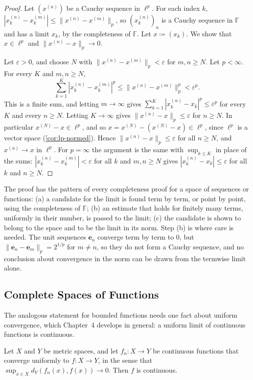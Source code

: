 \begin{proof}
Let $(x^{(n)})$ be a Cauchy sequence in $\ell^p$. For each index $k$, $|x^{(n)}_k-x^{(m)}_k|\le\|x^{(n)}-x^{(m)}\|_p$, so $(x^{(n)}_k)_n$ is a Cauchy sequence in $\mathbb F$ and has a limit $x_k$, by the completeness of $\mathbb F$. Let $x\coloneqq(x_k)$. We show that $x\in\ell^p$ and $\|x^{(n)}-x\|_p\to0$.

Let $\varepsilon>0$, and choose $N$ with $\|x^{(n)}-x^{(m)}\|_p<\varepsilon$ for $m,n\ge N$. Let $p<\infty$. For every $K$ and $m,n\ge N$,
\[
\sum_{k=1}^K|x^{(n)}_k-x^{(m)}_k|^p\le\|x^{(n)}-x^{(m)}\|_p^p<\varepsilon^p .
\]
This is a finite sum, and letting $m\to\infty$ gives $\sum_{k=1}^K|x^{(n)}_k-x_k|^p\le\varepsilon^p$ for every $K$ and every $n\ge N$. Letting $K\to\infty$ gives $\|x^{(n)}-x\|_p\le\varepsilon$ for $n\ge N$. In particular $x^{(N)}-x\in\ell^p$, and so $x=x^{(N)}-(x^{(N)}-x)\in\ell^p$, since $\ell^p$ is a vector space (\cref{cor:lp-normed}). Hence $\|x^{(n)}-x\|_p\le\varepsilon$ for all $n\ge N$, and $x^{(n)}\to x$ in $\ell^p$. For $p=\infty$ the argument is the same with $\sup_{k\le K}$ in place of the sums: $|x^{(n)}_k-x^{(m)}_k|<\varepsilon$ for all $k$ and $m,n\ge N$ gives $|x^{(n)}_k-x_k|\le\varepsilon$ for all $k$ and $n\ge N$.
\end{proof}

The proof has the pattern of every completeness proof for a space of sequences or functions: (a) a candidate for the limit is found term by term, or point by point, using the completeness of $\mathbb F$; (b) an estimate that holds for finitely many terms, uniformly in their number, is passed to the limit; (c) the candidate is shown to belong to the space and to be the limit in its norm. Step (b) is where care is needed. The unit sequences $\mathbf e_n$ converge term by term to $0$, but $\|\mathbf e_n-\mathbf e_m\|_p=2^{1/p}$ for $m\ne n$, so they do not form a Cauchy sequence, and no conclusion about convergence in the norm can be drawn from the termwise limit alone.

\subsection{Complete Spaces of Functions}

The analogous statement for bounded functions needs one fact about uniform convergence, which Chapter~4 develops in general: a uniform limit of continuous functions is continuous.

\begin{lemma}
\label{lem:uniform-limit}
Let $X$ and $Y$ be metric spaces, and let $f_n\colon X\to Y$ be continuous functions that converge uniformly to $f\colon X\to Y$, in the sense that $\sup_{x\in X}d_Y(f_n(x),f(x))\to0$. Then $f$ is continuous.
\end{lemma}

